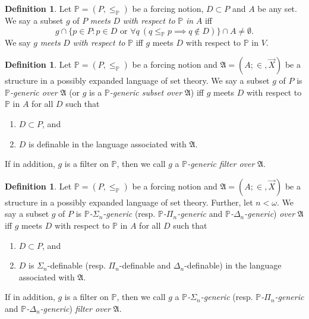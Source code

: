 \documentclass[12pt, twoside]{memoir}
\numberwithin{equation}{section}
\theoremstyle{definition}
\newtheorem{defi}[thm]{Definition}
\theoremstyle{remark}
\theoremstyle{definition}
\theoremstyle{definition}
\theoremstyle{definition}
\theoremstyle{remark}
\begin{document}
\begin{defi}
Let $\mathbb{P} = (P, \leq_{\mathbb{P}})$ be a forcing notion, $D \subset P$ and $A$ be any set. We say a subset $g$ of $P$ \emph{meets} $D$ \emph{with respect to} $\mathbb{P}$ \emph{in} $A$ iff $$g \cap \{p \in P : p \in D \text{ or } \forall q \ (q \leq_{\mathbb{P}} p \implies q \not\in D)\} \cap A \neq \emptyset.$$ We say $g$ \emph{meets} $D$ \emph{with respect to} $\mathbb{P}$ iff $g$ meets $D$ with respect to $\mathbb{P}$ in $V$.
\end{defi}

\begin{defi}
Let $\mathbb{P} = (P, \leq_{\mathbb{P}})$ be a forcing notion and $\mathfrak{A} = (A; \in, \Vec{X})$ be a structure in a possibly expanded language of set theory. We say a subset $g$ of $P$ is $\mathbb{P}$\emph{-generic over} $\mathfrak{A}$ (or $g$ is a $\mathbb{P}$\emph{-generic subset over} $\mathfrak{A}$) iff $g$ meets $D$ with respect to $\mathbb{P}$ in $A$ for all $D$ such that
\begin{enumerate}[label=(\alph*)]
    \item $D \subset P$, and
    \item $D$ is definable in the language associated with $\mathfrak{A}$.
\end{enumerate}
If in addition, $g$ is a filter on $\mathbb{P}$, then we call $g$ a $\mathbb{P}$\emph{-generic filter over} $\mathfrak{A}$.
\end{defi}

\begin{defi}
Let $\mathbb{P} = (P, \leq_{\mathbb{P}})$ be a forcing notion and $\mathfrak{A} = (A; \in, \Vec{X})$ be a structure in a possibly expanded language of set theory. Further, let $n < \omega$. We say a subset $g$ of $P$ is $\mathbb{P}$\emph{-}$\Sigma_n$\emph{-generic} (resp. $\mathbb{P}$\emph{-}$\Pi_n$\emph{-generic} and $\mathbb{P}$\emph{-}$\Delta_n$\emph{-generic}) \emph{over} $\mathfrak{A}$ iff $g$ meets $D$ with respect to $\mathbb{P}$ in $A$ for all $D$ such that
\begin{enumerate}[label=(\alph*)]
    \item $D \subset P$, and
    \item $D$ is $\Sigma_n$-definable (resp. $\Pi_n$-definable and $\Delta_n$-definable) in the language associated with $\mathfrak{A}$.
\end{enumerate}
If in addition, $g$ is a filter on $\mathbb{P}$, then we call $g$ a $\mathbb{P}$\emph{-}$\Sigma_n$\emph{-generic} (resp. $\mathbb{P}$\emph{-}$\Pi_n$\emph{-generic} and $\mathbb{P}$\emph{-}$\Delta_n$\emph{-generic}) \emph{filter over} $\mathfrak{A}$.
\end{defi}
\end{document}
